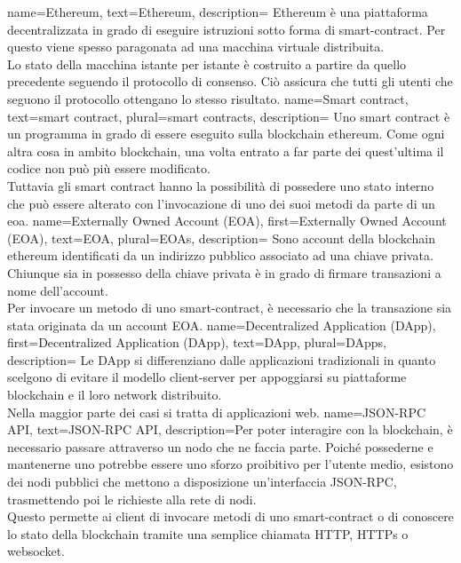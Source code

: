 {
    name={Ethereum},
    text={Ethereum},
    description={
            Ethereum è una piattaforma decentralizzata in grado di eseguire istruzioni sotto forma
            di \gls{smart-contract}.
            Per questo viene spesso paragonata ad una macchina virtuale distribuita. \\
            Lo stato della macchina istante per istante è costruito a partire da quello
            precedente seguendo il protocollo di consenso.
            Ciò assicura che tutti gli utenti che seguono il protocollo ottengano lo stesso
            risultato.
        }
}
{
    name={Smart contract},
    text={smart contract},
    plural={smart contracts},
    description={
            Uno smart contract è un programma in grado di essere eseguito sulla blockchain \gls{ethereum}.
            Come ogni altra cosa in ambito blockchain, una volta entrato a far parte dei quest'ultima
            il codice non può più essere modificato. \\
            Tuttavia gli smart contract hanno la possibilità di possedere uno stato interno che può essere
            alterato con l'invocazione di uno dei suoi metodi da parte di un \gls{eoa}.
        }
}
{
    name={Externally Owned Account (EOA)},
    first={Externally Owned Account (EOA)},
    text={EOA},
    plural={EOAs},
    description={
            Sono account della blockchain \gls{ethereum} identificati da un indirizzo pubblico associato ad una chiave privata.
            Chiunque sia in possesso della chiave privata è in grado di firmare transazioni a nome dell'account. \\
            Per invocare un metodo di uno \gls{smart-contract}, è necessario che la transazione sia stata originata da un account EOA.
        }
}
{
    name={Decentralized Application (DApp)},
    first={Decentralized Application (DApp)},
    text={DApp},
    plural={DApps},
    description={
            Le DApp si differenziano dalle applicazioni tradizionali in quanto scelgono di evitare il modello client-server
            per appoggiarsi su piattaforme blockchain e il loro network distribuito. \\
            Nella maggior parte dei casi si tratta di applicazioni web.
        }
}
{
    name={JSON-RPC API},
    text={JSON-RPC API},
    description={Per poter interagire con la blockchain, è necessario passare attraverso un nodo che ne faccia parte.
            Poiché possederne e mantenerne uno potrebbe essere uno sforzo proibitivo per l'utente medio, esistono dei nodi pubblici
            che mettono a disposizione un'interfaccia JSON-RPC, trasmettendo poi le richieste alla rete di nodi. \\
            Questo permette ai client di invocare metodi di uno \gls{smart-contract} o di conoscere lo stato della blockchain tramite una semplice chiamata HTTP, HTTPs o websocket.
        }
}
